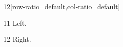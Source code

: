 \documentclass[paper=A4]{ropas-poster}
\begin{document}
\begin{postergrid}{1}{2}[row-ratio=default,col-ratio=default]
\begin{posterblock}{1}{1}
Left.
\end{posterblock}
\begin{posterblock}{1}{2}
Right.
\end{posterblock}
\end{postergrid}
\end{document}
